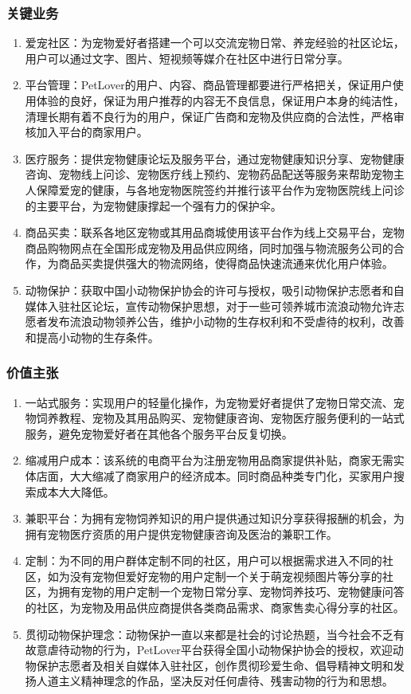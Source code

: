 \documentclass[a4paper]{ctexart}
\begin{document}
\subsubsection{关键业务}

\begin{enumerate}[label=\alph*.]
  \item 爱宠社区：为宠物爱好者搭建一个可以交流宠物日常、养宠经验的社区论坛，用户可以通过文字、图片、短视频等媒介在社区中进行日常分享。
  \item 平台管理：PetLover的用户、内容、商品管理都要进行严格把关，保证用户使用体验的良好，保证为用户推荐的内容无不良信息，保证用户本身的纯洁性，清理长期有着不良行为的用户，保证广告商和宠物及供应商的合法性，严格审核加入平台的商家用户。
  \item 医疗服务：提供宠物健康论坛及服务平台，通过宠物健康知识分享、宠物健康咨询、宠物线上问诊、宠物医疗线上预约、宠物药品配送等服务来帮助宠物主人保障爱宠的健康，与各地宠物医院签约并推行该平台作为宠物医院线上问诊的主要平台，为宠物健康撑起一个强有力的保护伞。
  \item 商品买卖：联系各地区宠物或其用品商城使用该平台作为线上交易平台，宠物商品购物网点在全国形成宠物及用品供应网络，同时加强与物流服务公司的合作，为商品买卖提供强大的物流网络，使得商品快速流通来优化用户体验。
  \item 动物保护：获取中国小动物保护协会的许可与授权，吸引动物保护志愿者和自媒体入驻社区论坛，宣传动物保护思想，对于一些可领养城市流浪动物允许志愿者发布流浪动物领养公告，维护小动物的生存权利和不受虐待的权利，改善和提高小动物的生存条件。
\end{enumerate}

\subsubsection{价值主张}

\begin{enumerate}[label=\alph*.]
  \item 一站式服务：实现用户的轻量化操作，为宠物爱好者提供了宠物日常交流、宠物饲养教程、宠物及其用品购买、宠物健康咨询、宠物医疗服务便利的一站式服务，避免宠物爱好者在其他各个服务平台反复切换。
  \item 缩减用户成本：该系统的电商平台为注册宠物用品商家提供补贴，商家无需实体店面，大大缩减了商家用户的经济成本。同时商品种类专门化，买家用户搜索成本大大降低。
  \item 兼职平台：为拥有宠物饲养知识的用户提供通过知识分享获得报酬的机会，为拥有宠物医疗资质的用户提供宠物健康咨询及医治的兼职工作。
  \item 定制：为不同的用户群体定制不同的社区，用户可以根据需求进入不同的社区，如为没有宠物但爱好宠物的用户定制一个关于萌宠视频图片等分享的社区，为拥有宠物的用户定制一个宠物日常分享、宠物饲养技巧、宠物健康问答的社区，为宠物及用品供应商提供各类商品需求、商家售卖心得分享的社区。
  \item 贯彻动物保护理念：动物保护一直以来都是社会的讨论热题，当今社会不乏有故意虐待动物的行为，PetLover平台获得全国小动物保护协会的授权，欢迎动物保护志愿者及相关自媒体入驻社区，创作贯彻珍爱生命、倡导精神文明和发扬人道主义精神理念的作品，坚决反对任何虐待、残害动物的行为和思想。
\end{enumerate}
\end{document}
